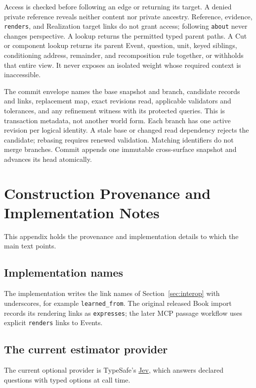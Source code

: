 \documentclass[11pt,a4paper]{article}
\begin{document}
Access is checked before following an edge or returning its target. A denied
private reference reveals neither content nor private ancestry. Reference,
evidence, \texttt{renders}, and Realization target links do not grant access;
following \texttt{about} never changes perspective. A lookup returns the
permitted typed parent paths. A Cut or component lookup returns its parent
Event, question, unit, keyed siblings, conditioning address, remainder, and
recomposition rule together, or withholds that entire view. It never exposes
an isolated weight whose required context is inaccessible.

The commit envelope names the base snapshot and branch, candidate records and
links, replacement map, exact revisions read, applicable validators and
tolerances, and any refinement witness with its protected queries. This is
transaction metadata, not another world form. Each branch has one active
revision per logical identity. A stale base or changed read dependency rejects
the candidate; rebasing requires renewed validation. Matching identifiers do
not merge branches. Commit appends one immutable cross-surface snapshot and
advances its head atomically.

\section{Construction Provenance and Implementation Notes}
\label{app:provenance}

This appendix holds the provenance and implementation details to which the main
text points.

\subsection{Implementation names}

The implementation writes the link names of Section~\ref{sec:interop} with underscores, for example
\texttt{learned\_from}. The original released Book import records its rendering
links as \texttt{expresses}; the later MCP passage workflow uses explicit
\texttt{renders} links to Events.

\subsection{The current estimator provider}

The current optional provider is TypeSafe's
\href{https://docs.typesafe.ai/introduction}{Jev}, which answers declared
questions with typed options at call time.
\end{document}
